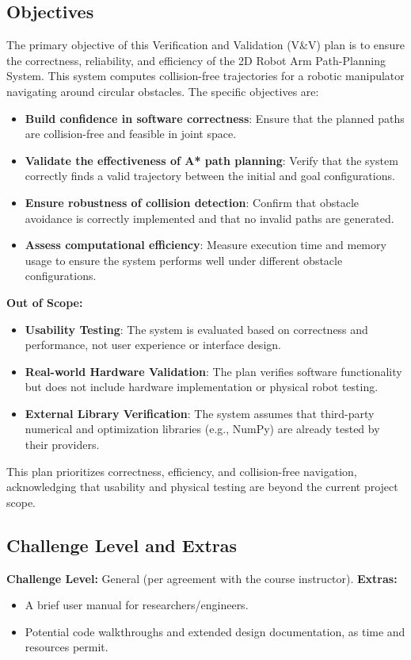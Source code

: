 \documentclass[12pt, titlepage]{article}
\begin{document}
\subsection{Objectives}

The primary objective of this Verification and Validation (V\&V) plan is to ensure the correctness, reliability, and efficiency of the 2D Robot Arm Path-Planning System. This system computes collision-free trajectories for a robotic manipulator navigating around circular obstacles. The specific objectives are:

\begin{itemize}
    \item \textbf{Build confidence in software correctness}: Ensure that the planned paths are collision-free and feasible in joint space.
    \item \textbf{Validate the effectiveness of A* path planning}: Verify that the system correctly finds a valid trajectory between the initial and goal configurations.
    \item \textbf{Ensure robustness of collision detection}: Confirm that obstacle avoidance is correctly implemented and that no invalid paths are generated.
    \item \textbf{Assess computational efficiency}: Measure execution time and memory usage to ensure the system performs well under different obstacle configurations.
\end{itemize}

\textbf{Out of Scope:}
\begin{itemize}
    \item \textbf{Usability Testing}: The system is evaluated based on correctness and performance, not user experience or interface design.
    \item \textbf{Real-world Hardware Validation}: The plan verifies software functionality but does not include hardware implementation or physical robot testing.
    \item \textbf{External Library Verification}: The system assumes that third-party numerical and optimization libraries (e.g., NumPy) are already tested by their providers.
\end{itemize}

This plan prioritizes correctness, efficiency, and collision-free navigation, acknowledging that usability and physical testing are beyond the current project scope.


\subsection{Challenge Level and Extras}
\textbf{Challenge Level:} General (per agreement with the course instructor).
\textbf{Extras:}
\begin{itemize}
    \item A brief user manual for researchers/engineers.
    \item Potential code walkthroughs and extended design documentation, as time and resources permit.
\end{itemize}
\end{document}

